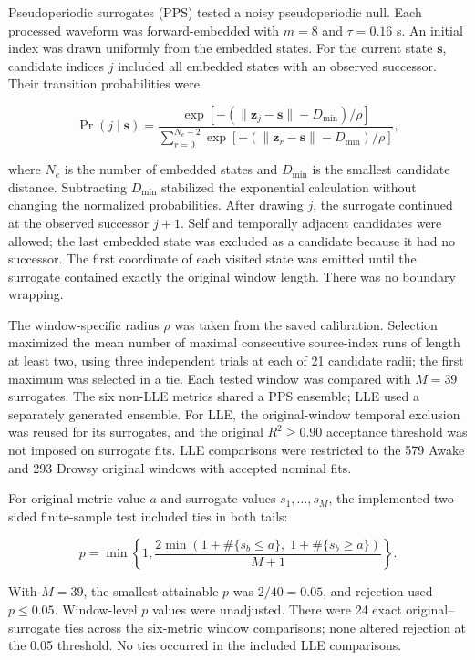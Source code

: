 Pseudoperiodic surrogates (PPS) tested a noisy pseudoperiodic null. Each processed waveform was forward-embedded with $m=8$ and $\tau=0.16$ s. An initial index was drawn uniformly from the embedded states. For the current state $\mathbf{s}$, candidate indices $j$ included all embedded states with an observed successor. Their transition probabilities were

\[
\Pr(j\mid\mathbf{s})=\frac{\exp[-(\|\mathbf{z}_j-\mathbf{s}\|-D_{\min})/\rho]}{\sum_{r=0}^{N_e-2}\exp[-(\|\mathbf{z}_r-\mathbf{s}\|-D_{\min})/\rho]},
\]

where $N_e$ is the number of embedded states and $D_{\min}$ is the smallest candidate distance. Subtracting $D_{\min}$ stabilized the exponential calculation without changing the normalized probabilities. After drawing $j$, the surrogate continued at the observed successor $j+1$. Self and temporally adjacent candidates were allowed; the last embedded state was excluded as a candidate because it had no successor. The first coordinate of each visited state was emitted until the surrogate contained exactly the original window length. There was no boundary wrapping.

The window-specific radius $\rho$ was taken from the saved calibration. Selection maximized the mean number of maximal consecutive source-index runs of length at least two, using three independent trials at each of 21 candidate radii; the first maximum was selected in a tie. Each tested window was compared with $M=39$ surrogates. The six non-LLE metrics shared a PPS ensemble; LLE used a separately generated ensemble. For LLE, the original-window temporal exclusion was reused for its surrogates, and the original $R^2\geq0.90$ acceptance threshold was not imposed on surrogate fits. LLE comparisons were restricted to the 579 Awake and 293 Drowsy original windows with accepted nominal fits.

For original metric value $a$ and surrogate values $s_1,\ldots,s_M$, the implemented two-sided finite-sample test included ties in both tails:

\[
p=\min\left\{1,\frac{2\min\left(1+\#\{s_b\leq a\},\;1+\#\{s_b\geq a\}\right)}{M+1}\right\}.
\]

With $M=39$, the smallest attainable $p$ was $2/40=0.05$, and rejection used $p\leq0.05$. Window-level $p$ values were unadjusted. There were 24 exact original--surrogate ties across the six-metric window comparisons; none altered rejection at the 0.05 threshold. No ties occurred in the included LLE comparisons.


